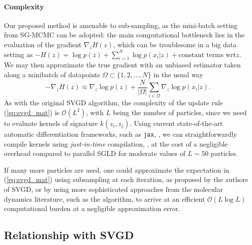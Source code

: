 \paragraph{Complexity}  Our proposed method is amenable to sub-sampling, as the mini-batch setting from SG-MCMC can be adopted: the main computational bottleneck lies in the evaluation of the gradient $\nabla_{{z}} H(z)$, which can be troublesome in a big data setting as $- H(z) = \log p(z) + \sum_{i=1}^N \log p({x}_i | {z}) + \mbox{constant terms wrt} z$.
We may then  approximate the true gradient with an unbiased estimator taken along a minibatch of datapoints $\Omega \subset \lbrace 1, 2, \ldots, N \rbrace$ in the usual way
$$
-\nabla_{{z}} H(z) \approx \nabla_{{z}} \log p({z}) + \frac{N}{| \Omega |} \sum_{i \in \Omega} \nabla_{{z}} \log p({x}_i | {z}).
$$
\noindent As with the original SVGD algorithm, the complexity of the update rule (\ref{eq:svgd_mat}) is $\mathcal{O}(L^2)$, with $L$ being the number of particles, since we need to evaluate kernels of signature $k(z_i, z_j)$. Using current state-of-the-art automatic differentiation frameworks, such as \texttt{jax}, \parencite{jax2018github}, we can straightforwardly compile kernels using \emph{just-in-time} compilation, \parencite{frostig2018compiling}, at the cost of a negligible overhead compared to parallel SGLD for moderate values of $L \sim 50$ particles.

If many more particles are  used, one could approximate the expectation in (\ref{eq:svgd_mat}) using subsampling at each iteration, as proposed by the authors of SVGD, or by using more sophisticated approaches from the molecular dynamics literature, such as the \cite{barnes1986hierarchical} algorithm, to arrive at an efficient $\mathcal{O}(L \log L)$ computational burden at a negligible approximation error. %


\subsection{Relationship with SVGD}\label{sec:relationship}

